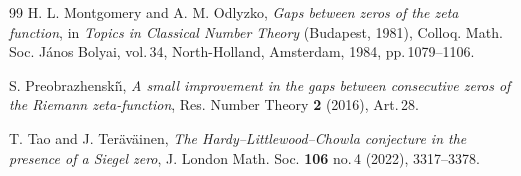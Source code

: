 \documentclass[12pt, oneside]{amsart}
\theoremstyle{definition}
\newcommand{\1}{\mathds{1}}
\begin{document}
\begin{thebibliography}{99}
 H. L. Montgomery and A. M. Odlyzko, \emph{Gaps between zeros of the zeta function}, in \emph{Topics in Classical Number Theory} (Budapest, 1981), Colloq. Math. Soc. J\'anos Bolyai, vol.\,34, North-Holland, Amsterdam, 1984, pp.\,1079--1106.

 S. Preobrazhenski\v{\i}, \emph{A small improvement in the gaps between consecutive zeros of the Riemann zeta-function}, Res. Number Theory {\bf 2} (2016), Art.\,28.

 T. Tao and J. Ter\"av\"ainen, \emph{The Hardy--Littlewood--Chowla conjecture in the presence of a Siegel zero}, J. London Math. Soc. {\bf 106} no.\,4 (2022), 3317--3378.


\end{thebibliography}
\end{document}
